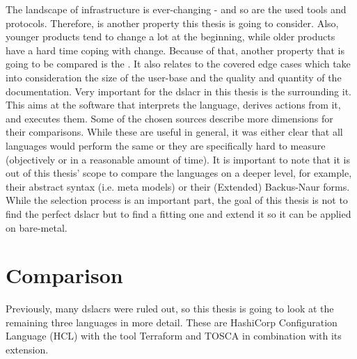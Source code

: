 The landscape of infrastructure is ever-changing - and so are the used tools and protocols. Therefore,  is another property this thesis is going to consider.
\newline
Also, younger products tend to change a lot at the beginning, while older products have a hard time coping with change. Because of that, another property that is going to be compared is the . It also relates to the covered edge cases which take into consideration the size of the user-base and the quality and quantity of the documentation.
\newline
Very important for the \gls{dslacr} in this thesis is the  surrounding it. This aims at the software that interprets the language, derives actions from it, and executes them.
\newline
Some of the chosen sources describe more dimensions for their comparisons. While these are useful in general, it was either clear that all languages would perform the same or they are specifically hard to measure (objectively or in a reasonable amount of time). %
\newline
It is important to note that it is out of this thesis' scope to compare the languages on a deeper level, for example, their abstract syntax (i.e. meta models) or their (Extended) Backus-Naur forms. While the selection process is an important part, the goal of this thesis is not to find the perfect \gls{dslacr} but to find a fitting one and extend it so it can be applied on bare-metal.


\section{Comparison}
Previously, many \gls{dslacr}s were ruled out, so this thesis is going to look at the remaining three languages in more detail. These are HashiCorp Configuration Language (HCL) with the tool Terraform and TOSCA in combination with its  extension.

